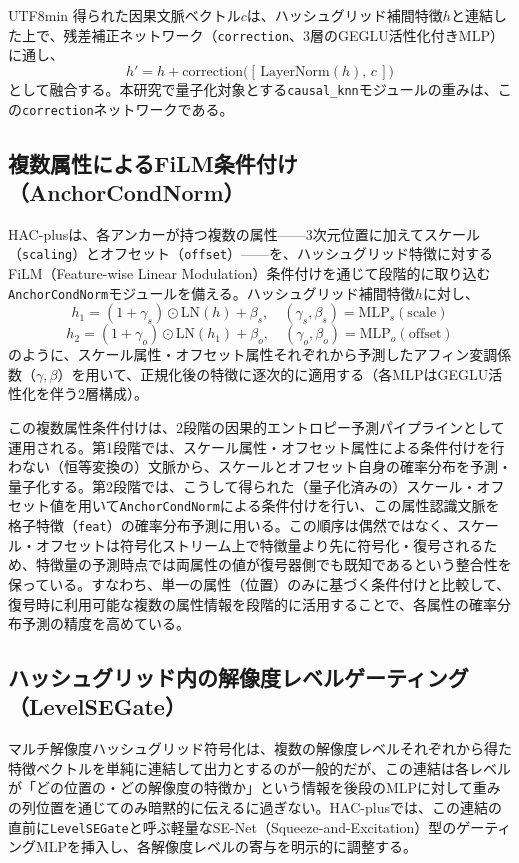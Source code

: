 \documentclass{ieeeaccess}
\begin{document}
\begin{CJK}{UTF8}{min}
得られた因果文脈ベクトル$c$は、ハッシュグリッド補間特徴$h$と連結した上で、残差補正ネットワーク（\texttt{correction}、3層のGEGLU活性化付きMLP）に通し、
\begin{equation}
h' = h + \mathrm{correction}\big([\,\mathrm{LayerNorm}(h),\, c\,]\big)
\end{equation}
として融合する。本研究で量子化対象とする\texttt{causal\_knn}モジュールの重みは、この\texttt{correction}ネットワークである。

\subsection{複数属性によるFiLM条件付け（AnchorCondNorm）}
\label{sec:anchor-cond-norm}
HAC-plusは、各アンカーが持つ複数の属性——3次元位置に加えてスケール（\texttt{scaling}）とオフセット（\texttt{offset}）——を、ハッシュグリッド特徴に対するFiLM（Feature-wise Linear Modulation）条件付けを通じて段階的に取り込む\texttt{AnchorCondNorm}モジュールを備える。ハッシュグリッド補間特徴$h$に対し、
\begin{equation}
h_1 = (1+\gamma_s)\odot\mathrm{LN}(h) + \beta_s,\quad (\gamma_s,\beta_s) = \mathrm{MLP}_s(\mathrm{scale})
\end{equation}
\begin{equation}
h_2 = (1+\gamma_o)\odot\mathrm{LN}(h_1) + \beta_o,\quad (\gamma_o,\beta_o) = \mathrm{MLP}_o(\mathrm{offset})
\end{equation}
のように、スケール属性・オフセット属性それぞれから予測したアフィン変調係数（$\gamma,\beta$）を用いて、正規化後の特徴に逐次的に適用する（各MLPはGEGLU活性化を伴う2層構成）。

この複数属性条件付けは、2段階の因果的エントロピー予測パイプラインとして運用される。第1段階では、スケール属性・オフセット属性による条件付けを行わない（恒等変換の）文脈から、スケールとオフセット自身の確率分布を予測・量子化する。第2段階では、こうして得られた（量子化済みの）スケール・オフセット値を用いて\texttt{AnchorCondNorm}による条件付けを行い、この属性認識文脈を格子特徴（\texttt{feat}）の確率分布予測に用いる。この順序は偶然ではなく、スケール・オフセットは符号化ストリーム上で特徴量より先に符号化・復号されるため、特徴量の予測時点では両属性の値が復号器側でも既知であるという整合性を保っている。すなわち、単一の属性（位置）のみに基づく条件付けと比較して、復号時に利用可能な複数の属性情報を段階的に活用することで、各属性の確率分布予測の精度を高めている。

\subsection{ハッシュグリッド内の解像度レベルゲーティング（LevelSEGate）}
\label{sec:level-se-gate}
マルチ解像度ハッシュグリッド符号化\cite{muller2022instant}は、複数の解像度レベルそれぞれから得た特徴ベクトルを単純に連結して出力とするのが一般的だが、この連結は各レベルが「どの位置の・どの解像度の特徴か」という情報を後段のMLPに対して重みの列位置を通じてのみ暗黙的に伝えるに過ぎない。HAC-plusでは、この連結の直前に\texttt{LevelSEGate}と呼ぶ軽量なSE-Net（Squeeze-and-Excitation）型のゲーティングMLPを挿入し、各解像度レベルの寄与を明示的に調整する。


\end{CJK}
\end{document}
